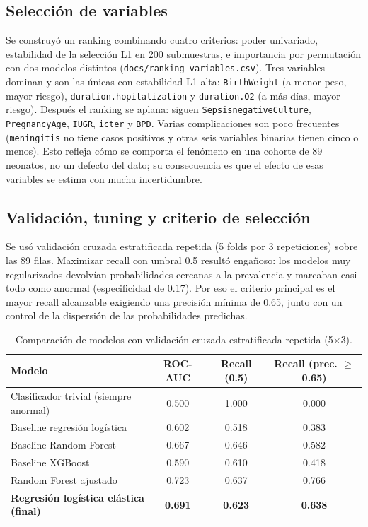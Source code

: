 \documentclass{llncs}
\begin{document}
\subsection{Selección de variables}

Se construyó un ranking combinando cuatro criterios: poder univariado,
estabilidad de la selección L1 en 200 submuestras, e importancia por permutación
con dos modelos distintos (\texttt{docs/ranking\_variables.csv}). Tres variables
dominan y son las únicas con estabilidad L1 alta: \texttt{BirthWeight} (a menor
peso, mayor riesgo), \texttt{duration.hopitalization} y \texttt{duration.O2} (a
más días, mayor riesgo). Después el ranking se aplana: siguen
\texttt{SepsisnegativeCulture}, \texttt{PregnancyAge}, \texttt{IUGR},
\texttt{icter} y \texttt{BPD}. Varias complicaciones son poco frecuentes
(\texttt{meningitis} no tiene casos positivos y otras seis variables binarias
tienen cinco o menos). Esto refleja cómo se comporta el fenómeno en una cohorte
de 89 neonatos, no un defecto del dato; su consecuencia es que el efecto de
esas variables se estima con mucha incertidumbre.

\subsection{Validación, tuning y criterio de selección}

Se usó validación cruzada estratificada repetida (5 folds por 3 repeticiones)
sobre las 89 filas. Maximizar recall con umbral 0.5 resultó engañoso: los
modelos muy regularizados devolvían probabilidades cercanas a la prevalencia y
marcaban casi todo como anormal (especificidad de 0.17). Por eso el criterio
principal es el mayor recall alcanzable exigiendo una precisión mínima de 0.65,
junto con un control de la dispersión de las probabilidades predichas.

\begin{table}[H]
\centering
\caption{Comparación de modelos con validación cruzada estratificada repetida (5$\times$3).}
\label{tab:modelos}
\begin{tabular}{|l|c|c|c|}
\hline
Modelo & ROC-AUC & Recall (0.5) & Recall (prec. $\geq$ 0.65) \\
\hline
Clasificador trivial (siempre anormal) & 0.500 & 1.000 & 0.000 \\
Baseline regresión logística & 0.602 & 0.518 & 0.383 \\
Baseline Random Forest & 0.667 & 0.646 & 0.582 \\
Baseline XGBoost & 0.590 & 0.610 & 0.418 \\
Random Forest ajustado & 0.723 & 0.637 & 0.766 \\
\textbf{Regresión logística elástica (final)} & \textbf{0.691} & \textbf{0.623} & \textbf{0.638} \\
\hline
\end{tabular}
\end{table}
\end{document}
